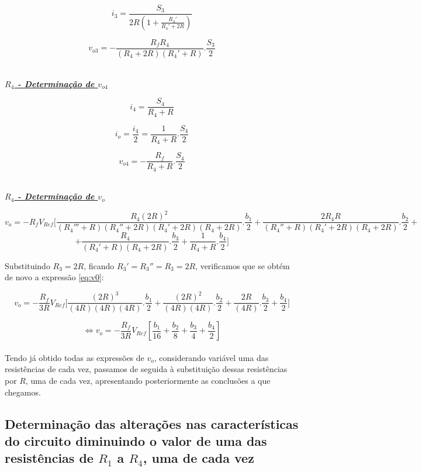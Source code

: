 \documentclass[a4paper,11pt]{report}
\begin{document}
$$i_3=\frac{S_3}{2R\left(1+\frac{R_4'}{R_4'+2R}\right)}$$

$$v_{o3}=-\frac{R_fR_4}{\left(R_4+2R\right)\left(R_4'+R\right)}.\frac{S_3}{2}$$\\

\par

\large\underline{\textit{\textbf{$R_4$ - Determinação de $v_{o4}$}}}\\
\par

$$i_4=\frac{S_4}{R_4+R}$$

$$i_o=\frac{i_4}{2}=\frac{1}{R_4+R}.\frac{S_4}{2}$$

$$v_{o4}=-\frac{R_f}{R_4+R}.\frac{S_4}{2}$$\\

\par

\large\underline{\textit{\textbf{$R_4$ - Determinação de $v_{o}$}}}\\
\par

$$v_o=-R_fV_{Ref}\Bigg[\frac{R_4\left(2R\right)^2}{\left(R_4'''+R\right)\left(R_4''+2R\right)\left(R_4'+2R\right)\left(R_4+2R\right)}.\frac{b_1}{2}+\frac{2R_4R}{\left(R_4''+R\right)\left(R_4'+2R\right)\left(R_4+2R\right)}.\frac{b_2}{2}+$$
\begin{equation}\label{eq:v0_4}
+\frac{R_4}{\left(R_4'+R\right)\left(R_4+2R\right)}.\frac{b_3}{2}+\frac{1}{R_4+R}.\frac{b_4}{2}\Bigg]
\end{equation}

Substituindo $R_3=2R$, ficando $R_3'=R_3''=R_3=2R$, verificamos que se obtém de novo a expressão \ref{eq:v0}:

$$v_o=-\frac{R_f}{3R}V_{Ref}\Bigg[\frac{\left(2R\right)^3}{\left(4R\right)\left(4R\right)\left(4R\right)}.\frac{b_1}{2}+\frac{\left(2R\right)^2}{\left(4R\right)\left(4R\right)}.\frac{b_2}{2}+\frac{2R}{\left(4R\right)}.\frac{b_3}{2}+\frac{b_4}{2}\Bigg]$$

$$\Leftrightarrow v_o=-\frac{R_f}{3R}V_{Ref}\left[\frac{b_1}{16}+\frac{b_2}{8}+\frac{b_3}{4}+\frac{b_4}{2}\right]$$\\

Tendo já obtido todas as expressões de $v_o$, considerando variável uma das resistências de cada vez, passamos de seguida à substituição dessas resistências por $R$, uma de cada vez, apresentando posteriormente as conclusões a que chegamos.

\subsection{Determinação das alterações nas características do circuito diminuindo o valor de uma das resistências de $R_1$ a $R_4$, uma de cada vez}
\end{document}
